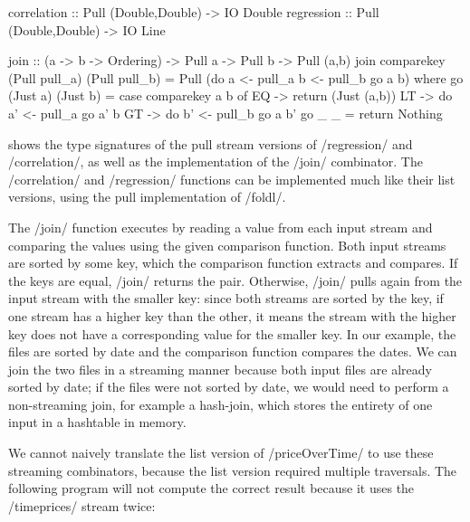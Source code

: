 \begin{haskell}[float,caption=Pull stream combinators,label=figs/impl/pull/combinator]
correlation :: Pull (Double,Double) -> IO Double
regression  :: Pull (Double,Double) -> IO Line

join        :: (a -> b -> Ordering) -> Pull a -> Pull b -> Pull (a,b)
join comparekey (Pull pull_a) (Pull pull_b) = Pull (do
   a <- pull_a
   b <- pull_b
   go a b)
 where
  go (Just a) (Just b)
   = case comparekey a b of
      EQ -> return (Just (a,b))
      LT -> do
        a' <- pull_a
        go a' b
      GT -> do
        b' <- pull_b
        go a b'
  go _ _ = return Nothing
\end{haskell}


 shows the type signatures of the pull stream versions of \Hs/regression/ and \Hs/correlation/, as well as the implementation of the \Hs/join/ combinator.
The \Hs/correlation/ and \Hs/regression/ functions can be implemented much like their list versions, using the pull implementation of \Hs/foldl/.

The \Hs/join/ function executes by reading a value from each input stream and comparing the values using the given comparison function.
Both input streams are sorted by some key, which the comparison function extracts and compares.
If the keys are equal, \Hs/join/ returns the pair.
Otherwise, \Hs/join/ pulls again from the input stream with the smaller key: since both streams are sorted by the key, if one stream has a higher key than the other, it means the stream with the higher key does not have a corresponding value for the smaller key.
In our \Hs@priceOverMarket@ example, the files are sorted by date and the comparison function compares the dates.
We can join the two files in a streaming manner because both input files are already sorted by date; if the files were not sorted by date, we would need to perform a non-streaming join, for example a hash-join, which stores the entirety of one input in a hashtable in memory.

We cannot naively translate the list version of \Hs/priceOverTime/ to use these streaming combinators, because the list version required multiple traversals.
The following program will not compute the correct result because it uses the \Hs/timeprices/ stream twice:

